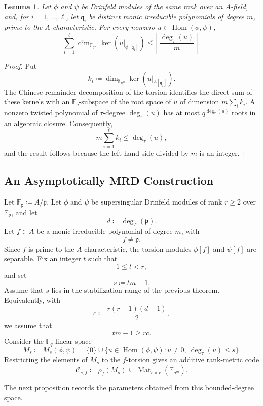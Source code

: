\documentclass[10pt,a4paper]{amsart}
\DeclareMathOperator{\Hom}{Hom}
\DeclareMathOperator{\Mat}{Mat}
\theoremstyle{definition}
\theoremstyle{plain}
\newtheorem{lemma}[definition]{Lemma}
\theoremstyle{remark}
\newcommand{\vF}{\mathbb F}
\begin{document}
\begin{lemma}
\label{lem:torsion-root-count}
Let $\phi$ and $\psi$ be Drinfeld modules of the same rank over an $A$-field,
and, for $i=1,\ldots,\ell$, let $\mathfrak q_i$ be distinct monic
irreducible polynomials of degree $m$, prime to the $A$-characteristic. For
every nonzero $u\in\Hom(\phi,\psi)$,
$$
\sum_{i=1}^{\ell}
\dim_{\vF_{q^m}}
\ker\left(u|_{\phi[\mathfrak q_i]}\right)
\leq
\left\lfloor\frac{\deg_\tau(u)}{m}\right\rfloor.
$$
\end{lemma}

\begin{proof}
Put
$$
k_i\coloneqq
\dim_{\vF_{q^m}}
\ker\left(u|_{\phi[\mathfrak q_i]}\right).
$$
The Chinese remainder decomposition of the torsion identifies the direct sum
of these kernels with an $\vF_q$-subspace of the root space of $u$ of
dimension $m\sum_i k_i$. A nonzero twisted polynomial of $\tau$-degree
$\deg_\tau(u)$ has at most $q^{\deg_\tau(u)}$ roots in an algebraic closure.
Consequently,
$$
m\sum_{i=1}^{\ell}k_i\leq\deg_\tau(u),
$$
and the result follows because the left hand side divided by $m$ is an
integer.
\end{proof}

\subsection{An Asymptotically MRD Construction}

Let $\vF_{\mathfrak p}\coloneqq A/\mathfrak p$.  Let $\phi$ and $\psi$ be
supersingular Drinfeld modules of rank $r\geq 2$ over
$\overline{\vF}_{\mathfrak p}$, and let
$$
d\coloneqq\deg_T(\mathfrak p).
$$
Let $f\in A$ be a monic irreducible polynomial of degree $m$, with
$$
f\neq \mathfrak p.
$$
Since $f$ is prime to the $A$-characteristic, the torsion modules $\phi[f]$ and $\psi[f]$ are separable. Fix an integer $t$ such that
$$
1\leq t<r,
$$
and set
$$
s\coloneqq tm-1.
$$
Assume that $s$ lies in the stabilization range of the previous theorem. Equivalently, with
$$
c\coloneqq\frac{r(r-1)(d-1)}{2},
$$
we assume that
$$
tm-1\geq rc.
$$
Consider the $\vF_q$-linear space
$$
M_s\coloneqq M_s(\phi,\psi)
=
\{0\}\cup\{u\in \Hom(\phi,\psi):u\neq 0,\ \deg_\tau(u)\leq s\}.
$$
Restricting the elements of $M_s$ to the $f$-torsion gives an additive rank-metric code
$$
\mathcal C_{s,f}\coloneqq \rho_f(M_s)\subseteq \Mat_{r\times r}(\vF_{q^m}).
$$

The next proposition records the parameters obtained from this bounded-degree space.
\end{document}

